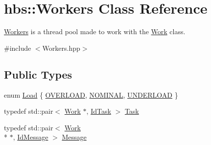 \hypertarget{classhbs_1_1_workers}{\section{hbs\-:\-:Workers Class Reference}
\label{classhbs_1_1_workers}
}


\hyperlink{classhbs_1_1_workers}{Workers} is a thread pool made to work with the \hyperlink{classhbs_1_1_work}{Work} class.  




{\ttfamily \#include $<$Workers.\-hpp$>$}

\subsection*{Public Types}
\begin{DoxyCompactItemize}
\item 
enum \hyperlink{classhbs_1_1_workers_a9bc855eea9a43df727e1a85b3520634f}{Load} \{ \hyperlink{classhbs_1_1_workers_a9bc855eea9a43df727e1a85b3520634fa7e0744a5720973af1c98c5225b8df8e5}{O\-V\-E\-R\-L\-O\-A\-D}, 
\hyperlink{classhbs_1_1_workers_a9bc855eea9a43df727e1a85b3520634fa6543896a2818caa3c00d40084f58c2b4}{N\-O\-M\-I\-N\-A\-L}, 
\hyperlink{classhbs_1_1_workers_a9bc855eea9a43df727e1a85b3520634fa2fbfb62e885cc85d531ed20e48ae354c}{U\-N\-D\-E\-R\-L\-O\-A\-D}
 \}
\item 
typedef std\-::pair$<$ \hyperlink{classhbs_1_1_work}{Work} $\ast$, \hyperlink{namespacehbs_aab8d06205ac2b0b14186327fd6c1c0d6}{Id\-Task} $>$ \hyperlink{classhbs_1_1_workers_a451e0985676c46558a1114b12dd96916}{Task}
\item 
typedef std\-::pair$<$ \hyperlink{classhbs_1_1_work}{Work} \\*
$\ast$, \hyperlink{namespacehbs_a6d744a52db9bca0a9752a009118641f4}{Id\-Message} $>$ \hyperlink{classhbs_1_1_workers_addd8065047a1fa376581419ffcda0685}{Message}
\end{DoxyCompactItemize}

